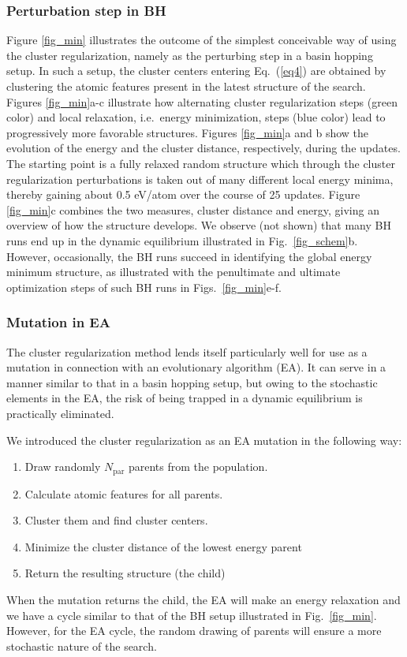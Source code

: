 \documentclass[aip,amsmath,amssymb,reprint]{revtex4-1}
\begin{document}
\subsubsection{Perturbation step in BH}
Figure \ref{fig_min} illustrates the outcome of the simplest
conceivable way of using the cluster regularization, namely as the
perturbing step in a basin hopping setup. In such a setup, the cluster
centers entering Eq.\ (\ref{eq4}) are obtained by clustering the
atomic features present in the latest structure of the search. Figures
\ref{fig_min}a-c illustrate how alternating cluster regularization
steps (green color) and local relaxation, i.e.\ energy minimization,
steps (blue color) lead to progressively more favorable
structures. Figures \ref{fig_min}a and b show the evolution of the
energy and the cluster distance, respectively, during the updates. The
starting point is a fully relaxed random structure which through the
cluster regularization perturbations is taken out of many different
local energy minima, thereby gaining about 0.5 eV/atom over the course of
25 updates. Figure \ref{fig_min}c combines the two measures, cluster
distance and energy, giving an overview of how the structure
develops. We observe (not shown) that many BH runs end up in the dynamic
equilibrium illustrated in Fig.\  \ref{fig_schem}b. However, occasionally, the BH runs succeed in
identifying the global energy minimum structure, as illustrated with
the penultimate and ultimate optimization steps of such BH runs in
Figs.\  \ref{fig_min}e-f.

\subsubsection{Mutation in EA}
The cluster regularization method lends itself particularly well for
use as a mutation in connection with an evolutionary algorithm (EA). It can
serve in a manner similar to that in a basin hopping setup, but owing
to the stochastic elements in the EA, the risk of being trapped in a
dynamic equilibrium is practically eliminated.

We introduced the cluster regularization as an EA mutation in the following way:
\begin{enumerate}
\item Draw randomly $N_\mathrm{par}$ parents from the population.
\item Calculate atomic features for all parents.
\item Cluster them and find cluster centers.
\item Minimize the cluster distance of the lowest energy parent
\item Return the resulting structure (the child)
\end{enumerate}
When the mutation returns the child, the EA will make an energy
relaxation and we have a cycle similar to that of the BH setup
illustrated in Fig.\  \ref{fig_min}. However, for the EA cycle, the
random drawing of parents will ensure a more stochastic nature of the
search.
\end{document}
